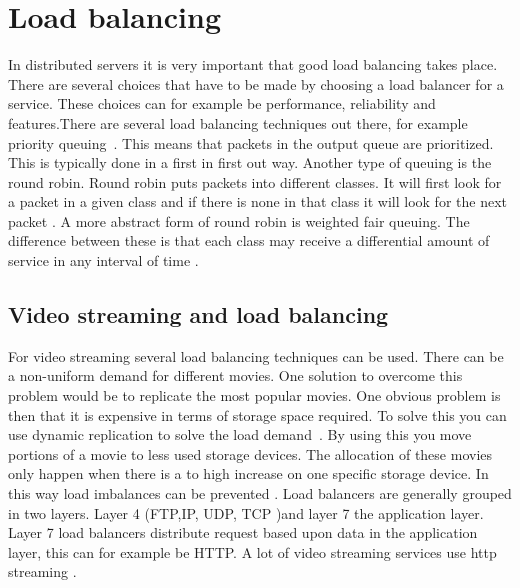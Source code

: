\documentclass{sig-alternate-br}
\begin{document}
\section{Load balancing}
In distributed servers it is very important that good load balancing takes place. There are several choices that have to be made by choosing a load balancer for a service. These choices can for example be performance, reliability and features.There are several load balancing techniques out there, for example priority queuing~\cite{computer-networking}. This means that packets in the output queue are prioritized. This is typically done in a first in first out way. Another type of queuing is the round robin. Round robin puts packets into different classes. It will first look for a packet in a given class and if there is none in that class it will look for the next packet \cite{computer-networking}. A more abstract form of round robin is weighted fair queuing. The difference between these is that each class may receive a differential amount of service in any interval of time \cite{computer-networking}.  
\subsection{Video streaming and load balancing}
For video streaming several load balancing techniques can be used. There can be a non-uniform demand for different movies. One solution to overcome this problem would be to replicate the most popular movies. One obvious problem is then that it is expensive in terms of storage space required. To solve this you can use dynamic replication to solve the load demand~\cite{dan1996load}. By using this you move portions of a movie to less used storage devices. The allocation of these movies only happen when there is a to high increase on one specific storage device. In this way load imbalances can be prevented \cite{dan1996load}. \newline
Load balancers are generally grouped in two layers. Layer 4 (FTP,IP, UDP, TCP )and layer 7 the application layer. Layer 7 load balancers distribute request based upon data in the application layer, this can for example be HTTP. A lot of video streaming services use http streaming \cite{Adhikari:2012}. 

\cite{wolf:1997,load-balancing}
\end{document}
